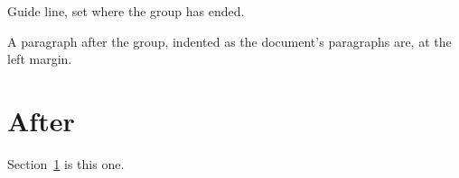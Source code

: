 \documentclass{article}
\begin{document}
\begingroup\leftskip=50pt\noindent Guide line, set where the group has ended.\leftskip=70pt\endgroup\par
A paragraph after the group, indented as the document's paragraphs are, at the left margin.
\section{After}\label{after}
Section~\ref{after} is this one.
\end{document}
